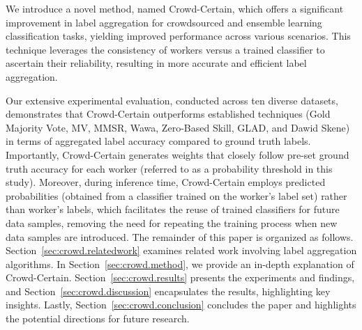 \documentclass[sn-nature]{bst/sn-jnl}
\begin{document}
We introduce a novel method, named Crowd-Certain, which offers a significant improvement in label aggregation for crowdsourced and ensemble learning classification tasks, yielding improved performance across various scenarios. This technique leverages the consistency of workers versus a trained classifier to ascertain their reliability, resulting in more accurate and efficient label aggregation.

Our extensive experimental evaluation, conducted across ten diverse datasets, demonstrates that Crowd-Certain outperforms established techniques (Gold Majority Vote, MV, MMSR, Wawa, Zero-Based Skill, GLAD, and Dawid Skene) in terms of aggregated label accuracy compared to ground truth labels. Importantly, Crowd-Certain generates weights that closely follow pre-set ground truth accuracy for each worker (referred to as a probability threshold in this study). Moreover, during inference time, Crowd-Certain employs predicted probabilities (obtained from a classifier trained on the worker's label set) rather than worker's labels, which facilitates the reuse of trained classifiers for future data samples, removing the need for repeating the training process when new data samples are introduced.
The remainder of this paper is organized as follows. Section~\ref{sec:crowd.relatedwork} examines related work involving label aggregation algorithms. In Section~\ref{sec:crowd.method}, we provide an in-depth explanation of Crowd-Certain. Section~\ref{sec:crowd.results} presents the experiments and findings, and Section~\ref{sec:crowd.discussion} encapsulates the results, highlighting key insights. Lastly, Section~\ref{sec:crowd.conclusion} concludes the paper and highlights the potential directions for future research.
\end{document}
